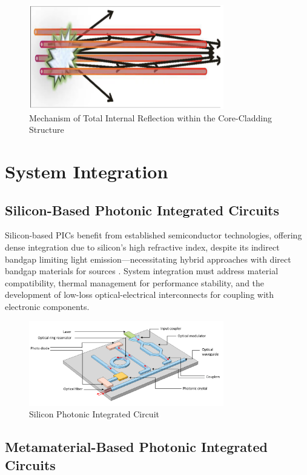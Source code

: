 \documentclass[10pt]{article}
\begin{document}
        \begin{figure}[h]
            \centering
            \includegraphics[width=8.5cm]{TotalInternal.png}
            \caption{Mechanism of Total Internal Reflection within the Core-Cladding Structure} 
            \end{figure}
        
        \section{System Integration}
        
\subsection{Silicon-Based Photonic Integrated Circuits}

Silicon-based PICs benefit from established semiconductor technologies, offering dense integration due to silicon's high refractive index, despite its indirect bandgap limiting light emission—necessitating hybrid approaches with direct bandgap materials for sources \cite{ref01}. System integration must address material compatibility, thermal management for performance stability, and the development of low-loss optical-electrical interconnects for coupling with electronic components.

\begin{figure}[h]
    \centering
    \includegraphics[width=8.5cm]{Silicon Photonic.png}
    \caption{Silicon Photonic Integrated Circuit} 
    \end{figure}

\subsection{Metamaterial-Based Photonic Integrated Circuits}
\end{document}
